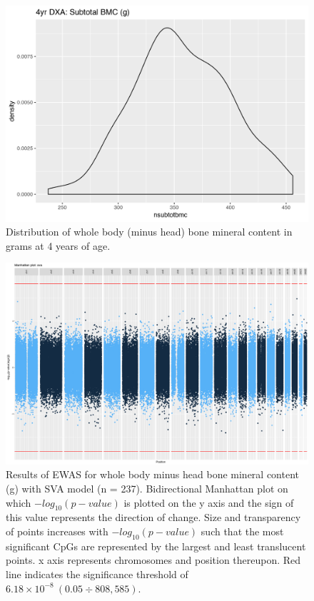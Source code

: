 \documentclass[
]{book}
\begin{document}
\begin{figure}

{\centering \includegraphics[width=0.8\linewidth]{figs/MAVIDOSIInsubtotbmc} 

}

\caption{Distribution of whole body (minus head) bone mineral content in grams at 4 years of age.}\label{fig:MAVIDOSIInsubtotbmc}
\end{figure}



\begin{figure}

{\centering \includegraphics[width=0.8\linewidth]{figs/MAVIDOSIInsubtotbmcEPICewasManhattanSVA} 

}

\caption{Results of EWAS for whole body minus head bone mineral content (g) with SVA model (n = 237). Bidirectional Manhattan plot on which \(-log_{10}(p-value)\) is plotted on the y axis and the sign of this value represents the direction of change. Size and transparency of points increases with \(-log_{10}(p-value)\) such that the most significant CpGs are represented by the largest and least translucent points. x axis represents chromosomes and position thereupon. Red line indicates the significance threshold of \(6.18\times10^{-8}~(0.05\div808,585)\).}\label{fig:MAVIDOSIInsubtotbmcEPICewasManhattanSVA}
\end{figure}
\end{document}
